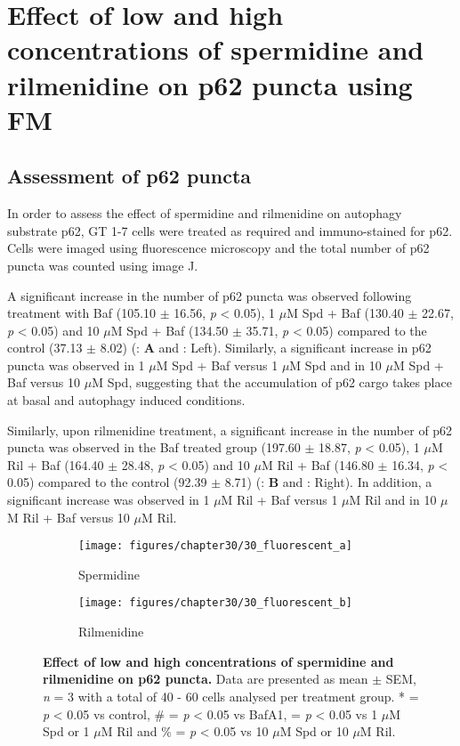 {\section{Effect of low and high concentrations of spermidine and rilmenidine on p62 puncta using FM}
\subsection{Assessment of p62 puncta}
In order to assess the effect of spermidine and rilmenidine on autophagy substrate p62, GT 1-7 cells were treated as required and immuno-stained for p62. Cells were imaged using fluorescence microscopy and the total number of p62 puncta was counted using image J. 

A significant increase in the number of p62 puncta was observed following treatment with Baf (105.10 $\pm$ 16.56, \textit{p} < 0.05), 1 $\mu$M Spd + Baf (130.40 $\pm$ 22.67, \textit{p} < 0.05) and 10 $\mu$M Spd + Baf (134.50 $\pm$ 35.71, \textit{p} < 0.05) compared to the control (37.13 $\pm$ 8.02) (: \textbf{A} and : Left). Similarly, a significant increase in p62 puncta was observed in 1 $\mu$M Spd + Baf versus 1 $\mu$M Spd and in 10 $\mu$M Spd + Baf versus 10 $\mu$M Spd, suggesting that the accumulation of p62 cargo takes place at basal and autophagy induced conditions. 

Similarly, upon rilmenidine treatment, a significant increase in the number of p62 puncta was observed in the Baf treated group (197.60 $\pm$ 18.87, \textit{p} < 0.05), 1 $\mu$M Ril + Baf (164.40 $\pm$ 28.48, \textit{p} < 0.05) and 10 $\mu$M Ril + Baf (146.80 $\pm$ 16.34, \textit{p} < 0.05) compared to the control (92.39 $\pm$ 8.71) (: \textbf{B} and : Right). In addition, a significant increase was observed in 1 $\mu$M Ril + Baf versus 1 $\mu$M Ril and in 10 $\mu$M Ril + Baf versus 10 $\mu$M Ril.

\begin{figure}[!htbp]
  \begin{subfigure}[b]{0.495\linewidth}
    \texttt{[image: figures/chapter30/30\_fluorescent\_a]}
    \caption{Spermidine}
  \end{subfigure}
  \begin{subfigure}[b]{0.495\linewidth}
    \texttt{[image: figures/chapter30/30\_fluorescent\_b]}
    \caption{Rilmenidine}
  \end{subfigure}
    \caption[Effect of low and high concentrations of spermidine and rilmenidine on p62 puncta]{\textbf{Effect of low and high concentrations of spermidine and rilmenidine on p62 puncta.} Data are presented as mean $\pm$ SEM, \textit{n} = 3 with a total of 40 - 60 cells analysed per treatment group. * = \textit{p} < 0.05 vs control, \# = \textit{p} < 0.05 vs BafA1, \@ = \textit{p} < 0.05 vs 1 $\mu$M Spd or 1 $\mu$M Ril and \% = \textit{p} < 0.05 vs 10 $\mu$M Spd or 10 $\mu$M Ril.}
  \label{fig:30_fluorescent_graph}
\end{figure}

}
